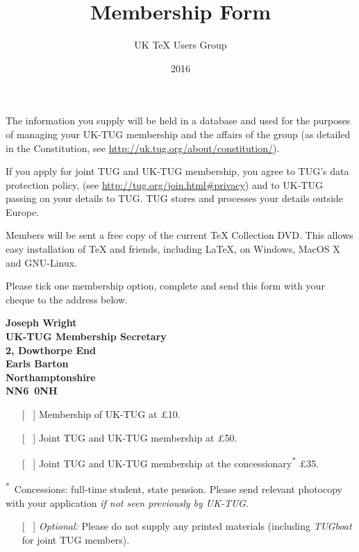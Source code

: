 \documentclass[a4paper,11pt,UKenglish]{article}
\title{Membership Form}
\author{UK \TeX{} Users Group}
\date{2016}
\begin{document}
\thispagestyle{empty}

\begin{minipage}{\textwidth}
  \makeatletter
  {\Large \@author}
  
  \smallskip
  
  {\large \@title{} \@date}
  
  \medskip
\end{minipage}

The information you supply will be held in a database and used for the purposes
of managing your UK-TUG membership and the affairs of the group (as detailed in
the Constitution, see \url{http://uk.tug.org/about/constitution/}).

If you apply for joint TUG and UK-TUG membership, you agree to TUG's data
protection policy, (see \url{http://tug.org/join.html#privacy}) and to UK-TUG
passing on your details to TUG. TUG stores and processes your details outside
Europe.

Members will be sent a free copy of the current \TeX{} Collection DVD. This
allows easy installation of \TeX{} and friends, including \LaTeX{}, on Windows,
MacOS X and GNU-Linux.

Please tick one membership option, complete and send this form with your cheque
to the address below.

\begin{minipage}{\textwidth}
  \bfseries
  Joseph Wright\\
  UK-TUG Membership Secretary\\
  2, Dowthorpe End\\
  Earls Barton\\
  Northamptonshire\\
  NN6~0NH
\end{minipage}

\medskip

\begin{itemize}
  \item [[~]] Membership of UK-TUG at \pounds 10.
  \item [[~]] Joint TUG and UK-TUG membership at \pounds 50.
  \item [[~]] Joint TUG and UK-TUG membership at the 
    concessionary\textsuperscript{*} \pounds 35.
\end{itemize}
\textsuperscript{*}~Concessions: full-time student, state pension. Please send
relevant photocopy with your application \emph{if not seen previously by
UK-TUG}.

\begin{itemize}
  \item [[~]] \emph{Optional:} Please do not supply any printed materials
    (including \emph{TUGboat} for joint TUG members).
\end{itemize}
\end{document}
